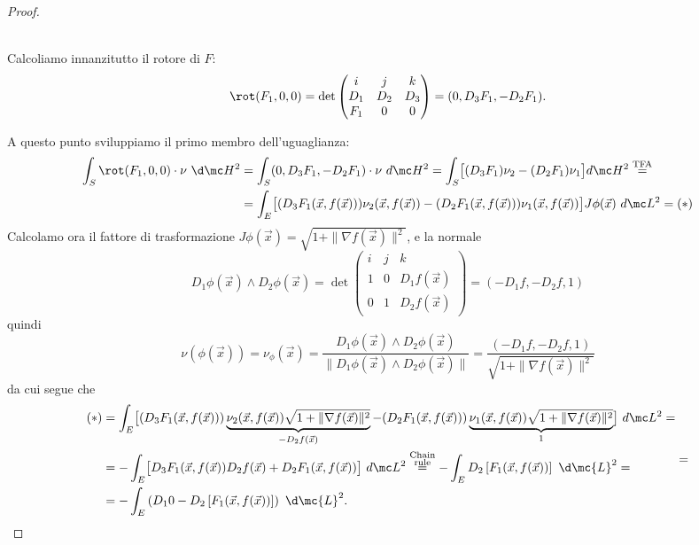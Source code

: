 \begin{proof}
\begin{itemize}
        \\
        Calcoliamo innanzitutto il rotore di $F$:
        \[\rot (F_1,0,0) = \det \begin{pmatrix}
            i & j & k \\
            D_1 & D_2 & D_3 \\
            F_1 & 0 & 0
        \end{pmatrix} = (0,D_3F_1, -D_2F_1).\]
    \end{itemize}
    A questo punto sviluppiamo il primo membro dell'uguaglianza:
    \[\begin{aligned}
        \int_S \rot (F_1, 0, 0) \cdot \nu\ \d\mc H^2 & = \int_S (0,D_3F_1, -D_2F_1) \cdot \nu \ d\mc H^2 = \int_S\bigl[ (D_3F_1)\nu_2-(D_2F_1)\nu_1 \bigr]d\mc H^2 \overset{\text{TFA}} =\\ &= \int_E\bigl[ (D_3F_1(\vec x, f(\vec x)))\nu_2(\vec x, f(\vec x))-(D_2F_1(\vec x, f(\vec x)))\nu_1(\vec x, f(\vec x)) \bigr]J\phi(\vec x)\ d\mc L^2 = (\ast)\\ 
    \end{aligned}\]
    Calcolamo ora il fattore di trasformazione $J\phi(\vec x) = \sqrt{1+\|\nabla f(\vec x)\|^2}$, e la normale
    \[D_1\phi(\vec x) \wedge D_2\phi(\vec x) = \det \begin{pmatrix}
        i & j & k\\
        1 & 0 & D_1f(\vec x)\\
        0 & 1 & D_2f(\vec x)
    \end{pmatrix} = (-D_1f, -D_2f, 1)\]
    quindi 
    \[\nu(\phi(\vec x)) = \nu_\phi(\vec x) = \frac{D_1\phi(\vec x) \wedge D_2\phi(\vec x)}{\|D_1\phi(\vec x) \wedge D_2\phi(\vec x)\|} = \frac{(-D_1f, -D_2f, 1)}{\sqrt{1+\|\nabla f(\vec x)\|^2}}\]
    da cui segue che 
    \[\begin{aligned}(\ast) &= \int_E\bigl[ (D_3F_1(\vec x, f(\vec x)))\underbrace{\nu_2(\vec x, f(\vec x))\sqrt{1+\|\nabla f(\vec x)\|^2}}_{-D_2f(\vec x)}-(D_2F_1(\vec x, f(\vec x)))\underbrace{\nu_1(\vec x, f(\vec x))\sqrt{1+\|\nabla f(\vec x)\|^2}}_1 \bigr]\ d\mc L^2 = \\ &= -\int_E\bigl[ D_3F_1(\vec x, f(\vec x))D_2f(\vec x)+D_2F_1(\vec x, f(\vec x))\bigr]\ d\mc L^2 \overset{\substack{\text{Chain}\\\text{rule}}}=- \int_E D_2\left[ F_1(\vec x, f(\vec x)) \right]\ \d \mc{L}^2 =\\ &=
    -\int_E \left(D_1 0-D_2\left[ F_1(\vec x, f(\vec x)) \right]\right)\ \d \mc{L}^2. \end{aligned} = \]

\end{proof}

